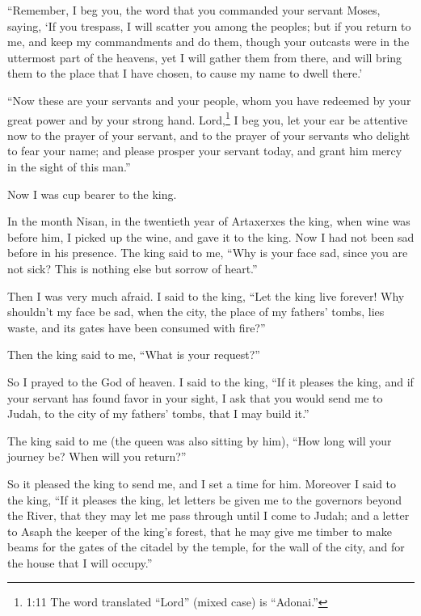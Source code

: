 \myverse{}“Remember, I beg you, the word that you commanded your servant
Moses, saying, ‘If you trespass, I will scatter you among the peoples;
\myverse{}but if you return to me, and keep my commandments and do them, though your outcasts
were in the uttermost part of the heavens, yet I will gather them from there, and will bring them to the
place that I have chosen, to cause my name to dwell there.’

\myverse{}“Now these are your servants and your people, whom you have redeemed
by your great power and by your strong hand.
\myverse{}Lord,\footnote{1:11 The word translated “Lord” (mixed case) is “Adonai.”} I beg you, let your ear be attentive
now to the prayer of your servant, and to the prayer of your servants who delight to fear your name; and
please prosper your servant today, and grant him mercy in the sight of this man.”

Now I was cup bearer to the king.


\mychapter{} \myverse*{}In the month Nisan, in the twentieth year of Artaxerxes the king,
when wine was before him, I picked up the wine, and gave it to the king. Now I had not been sad before
in his presence.
\myverse{}The king said to me, “Why is your face sad, since you are not sick? This is
nothing else but sorrow of heart.”

Then I was very much afraid.
\myverse{}I said to the king, “Let the king live forever! Why shouldn’t my face be sad,
when the city, the place of my fathers’ tombs, lies waste, and its gates have been consumed with fire?”

\myverse{}Then the king said to me, “What is your request?”

So I prayed to the God of heaven.
\myverse{}I said to the king, “If it pleases the king, and if your servant has found favor
in your sight, I ask that you would send me to Judah, to the city of my fathers’ tombs, that I may build
it.”

\myverse{}The king said to me (the queen was also sitting by him), “How long
will your journey be? When will you return?”

So it pleased the king to send me, and I set a time for him.
\myverse{}Moreover I said to the king, “If it pleases the king, let letters be given me
to the governors beyond the River, that they may let me pass through until I come to Judah;
\myverse{}and a letter to Asaph the keeper of the king’s forest, that he may give me timber
to make beams for the gates of the citadel by the temple, for the wall of the city, and for the house
that I will occupy.”

